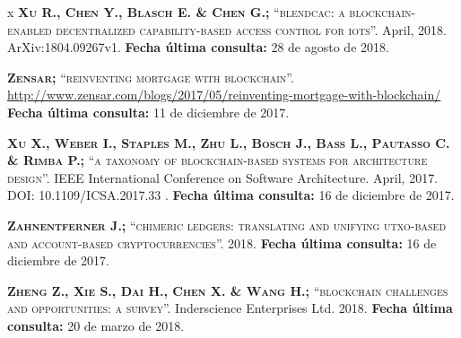 \begin{thebibliography} {x}
	 \textsc{\textbf{Xu R., Chen Y., Blasch E. \& Chen G.; }} \textsc{“blendcac: a blockchain-enabled decentralized capability-based access control for iots”.} April, 2018. ArXiv:1804.09267v1.
	\newline \textbf{Fecha última consulta:} 28 de agosto de 2018.
	
	 \textsc{\textbf{Zensar; }} \textsc{“reinventing mortgage with blockchain”.}
	\url{http://www.zensar.com/blogs/2017/05/reinventing-mortgage-with-blockchain/}
	\newline \textbf{Fecha última consulta:} 11 de diciembre de 2017.
		
	 \textsc{\textbf{Xu X., Weber I., Staples M., Zhu L., Bosch J., Bass L., Pautasso C. \& Rimba P.; }} \textsc{“a taxonomy of blockchain-based systems for architecture design”.} IEEE International Conference on Software Architecture. April, 2017. DOI: 10.1109/ICSA.2017.33 .
	\newline \textbf{Fecha última consulta:} 16 de diciembre de 2017.
	
	 \textsc{\textbf{Zahnentferner J.; }} \textsc{“chimeric ledgers: translating and unifying utxo-based and account-based cryptocurrencies”.} 2018.
	\newline \textbf{Fecha última consulta:} 16 de diciembre de 2017.
	
	 \textsc{\textbf{Zheng Z., Xie S., Dai H., Chen X. \& Wang H.; }} \textsc{“blockchain challenges and opportunities: a survey”.} Inderscience Enterprises Ltd. 2018.
	\newline \textbf{Fecha última consulta:} 20 de marzo de 2018.
		
	\endgroup
\end{thebibliography}